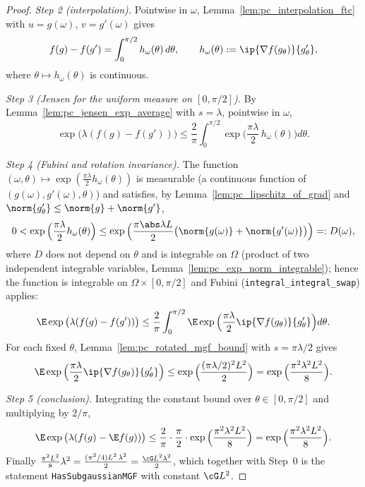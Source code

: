 \begin{proof}
\emph{Step 2 (interpolation).} Pointwise in $\omega$, Lemma~\ref{lem:pc_interpolation_ftc}
with $u = g(\omega)$, $v = g'(\omega)$ gives
\[
  f(g) - f(g') = \int_0^{\pi/2}h_\omega(\theta)\,d\theta, \qquad
  h_\omega(\theta) := \ip{\nabla f(g_\theta)}{g'_\theta},
\]
where $\theta \mapsto h_\omega(\theta)$ is continuous.

\emph{Step 3 (Jensen for the uniform measure on $[0,\pi/2]$).} By
Lemma~\ref{lem:pc_jensen_exp_average} with $s = \lambda$, pointwise in $\omega$,
\[
  \exp\big(\lambda(f(g) - f(g'))\big)
  \le \frac2\pi\int_0^{\pi/2}\exp\Big(\frac{\pi\lambda}{2}\,h_\omega(\theta)\Big)d\theta .
\]

\emph{Step 4 (Fubini and rotation invariance).} The function
$(\omega,\theta) \mapsto \exp(\frac{\pi\lambda}{2}h_\omega(\theta))$ is measurable (a continuous
function of $(g(\omega), g'(\omega), \theta)$) and satisfies, by
Lemma~\ref{lem:pc_lipschitz_of_grad} and $\norm{g'_\theta} \le \norm{g} + \norm{g'}$,
\[
  0 < \exp\Big(\frac{\pi\lambda}{2}h_\omega(\theta)\Big)
  \le \exp\Big(\frac{\pi\abs\lambda L}{2}\big(\norm{g(\omega)} + \norm{g'(\omega)}\big)\Big) =: D(\omega),
\]
where $D$ does not depend on $\theta$ and is integrable on $\Omega$ (product of two
independent integrable variables, Lemma~\ref{lem:pc_exp_norm_integrable}); hence the function
is integrable on $\Omega\times[0,\pi/2]$ and Fubini (\texttt{integral\_integral\_swap})
applies:
\[
  \E\exp\big(\lambda(f(g) - f(g'))\big)
  \le \frac2\pi\int_0^{\pi/2}\E\exp\Big(\frac{\pi\lambda}{2}\ip{\nabla f(g_\theta)}{g'_\theta}\Big)d\theta .
\]
For each fixed $\theta$, Lemma~\ref{lem:pc_rotated_mgf_bound} with $s = \pi\lambda/2$ gives
\[
  \E\exp\Big(\frac{\pi\lambda}{2}\ip{\nabla f(g_\theta)}{g'_\theta}\Big)
  \le \exp\Big(\frac{(\pi\lambda/2)^2L^2}{2}\Big) = \exp\Big(\frac{\pi^2\lambda^2L^2}{8}\Big).
\]

\emph{Step 5 (conclusion).} Integrating the constant bound over $\theta \in [0,\pi/2]$ and
multiplying by $2/\pi$,
\[
  \E\exp\big(\lambda(f(g) - \E f(g))\big) \le \frac2\pi\cdot\frac\pi2\cdot\exp\Big(\frac{\pi^2\lambda^2L^2}{8}\Big)
  = \exp\Big(\frac{\pi^2\lambda^2L^2}{8}\Big).
\]
Finally $\frac{\pi^2L^2}{8}\lambda^2 = \frac{(\pi^2/4)L^2\,\lambda^2}{2} = \frac{\cG L^2\lambda^2}{2}$,
which together with Step~0 is the statement \texttt{HasSubgaussianMGF} with constant
$\cG L^2$.
\end{proof}

